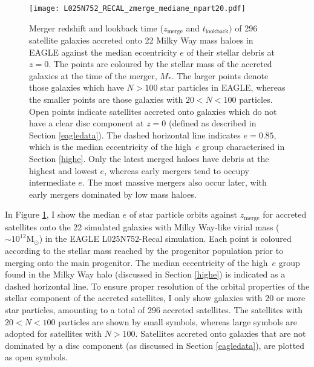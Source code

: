 \begin{figure}
\texttt{[image: L025N752\_RECAL\_zmerge\_mediane\_npart20.pdf]}
\caption[Median eccentricity of satellites accreted onto Milky Way mass haloes as a function of their merger time, in the Recal-L025N0752 EAGLE simulation]{\label{fig:eagle}Merger redshift and lookback
time ($z_\mathrm{merge}$ and $t_{\mathrm{lookback}})$ of 296
satellite galaxies accreted onto 22 Milky Way mass haloes in EAGLE
against the median eccentricity $e$ of their stellar debris at
$z=0$. The points are coloured by the stellar mass of the accreted
galaxies at the time of the merger, $M_*$. The larger points denote
those galaxies which have $N > 100$ star particles in EAGLE, whereas
the smaller points are those galaxies with $20 < N < 100$ particles.
Open points indicate satellites accreted onto galaxies which do not
have a clear disc component at $z=0$ (defined as described in Section
\ref{eagledata}). The dashed horizontal line indicates $e = 0.85$,
which is the median eccentricity of the high~$e$ group characterised
in Section \ref{highe}. Only the latest merged haloes have debris
at the highest and lowest $e$, whereas early mergers tend to occupy
intermediate $e$. The most massive mergers also occur later, with
early mergers dominated by low mass haloes.}
\end{figure}

In Figure \ref{fig:eagle},
I show the median $e$ of star particle orbits against
$z_\mathrm{merge}$ for accreted satellites onto the 22
simulated galaxies with Milky Way-like virial mass ($\sim 10^{12}
\mathrm{M_{\odot}}$) in the EAGLE L025N752-Recal simulation.
Each point is coloured according to the stellar mass reached
by the progenitor population prior to merging onto the main
progenitor. The median eccentricity of the high~$e$ group
found in the Milky Way halo (discussed in Section \ref{highe}) is indicated as a dashed horizontal line. To
ensure proper resolution of the orbital properties of the stellar
component of the accreted satellites, I only show galaxies with
20 or more star particles, amounting to a total of 296 accreted
satellites. The satellites with $20 < N < 100$ particles are shown
by small symbols, whereas large symbols are adopted
for satellites with $N > 100$.  Satellites accreted onto
galaxies that are not dominated by a disc component (as discussed
in Section \ref{eagledata}), are plotted as open symbols.

